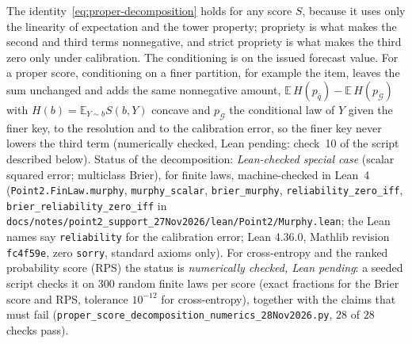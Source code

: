 The identity~\eqref{eq:proper-decomposition} holds for any score $S$, because it uses only the linearity of expectation and the tower property; propriety is what makes the second and third terms nonnegative, and strict propriety is what makes the third zero only under calibration.
The conditioning is on the issued forecast value.
For a proper score, conditioning on a finer partition, for example the item, leaves the sum unchanged and adds the same nonnegative amount, $\mathbb{E}\,H(p_{\hat q})-\mathbb{E}\,H(p_{\mathcal G})$ with $H(b)=\mathbb{E}_{Y\sim b}S(b,Y)$ concave and $p_{\mathcal G}$ the conditional law of $Y$ given the finer key, to the resolution and to the calibration error, so the finer key never lowers the third term (numerically checked, Lean pending: check~10 of the script described below).
Status of the decomposition: \emph{Lean-checked special case} (scalar squared error; multiclass Brier), for finite laws, machine-checked in Lean~4 (\texttt{Point2.FinLaw.murphy}, \texttt{murphy\_\allowbreak scalar}, \texttt{brier\_\allowbreak murphy}, \texttt{reliability\_\allowbreak zero\_\allowbreak iff}, \texttt{brier\_\allowbreak reliability\_\allowbreak zero\_\allowbreak iff} in \texttt{docs/\allowbreak notes/\allowbreak point2\_\allowbreak support\_\allowbreak 27Nov2026/\allowbreak lean/\allowbreak Point2/\allowbreak Murphy.lean}; the Lean names say \texttt{reliability} for the calibration error; Lean 4.36.0, Mathlib revision \texttt{fc4f59e}, zero \texttt{sorry}, standard axioms only).
For cross-entropy and the ranked probability score (RPS) the status is \emph{numerically checked, Lean pending}: a seeded script checks it on $300$ random finite laws per score (exact fractions for the Brier score and RPS, tolerance $10^{-12}$ for cross-entropy), together with the claims that must fail (\texttt{proper\_\allowbreak score\_\allowbreak decomposition\_\allowbreak numerics\_\allowbreak 28Nov2026.py}, $28$ of $28$ checks pass).


